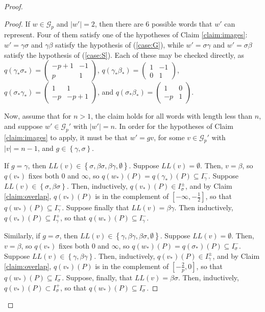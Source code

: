 \documentclass[10pt,a4paper]{amsart}
\newcommand{\set}[1]{ \left\{ #1 \right\} }
\begin{document}
\begin{proof}
\begin{proof}
If $w \in \mathcal{G}_p$ and $|w'| = 2$, then there are 6 possible words that $w'$ can represent. Four of them satisfy one of the hypotheses of Claim \ref{claim:images}: $w' = \gamma \sigma$ and $\gamma \beta$ satisfy the hypothesis of (\ref{case:G}), while  $w' = \sigma \gamma$ and $w' =  \sigma \beta $ satisfy the hypothesis of (\ref{case:S}). Each of these may be checked directly, as $q(\gamma_* \sigma_*) = \begin{pmatrix} -p+1 & -1 \\ p & 1 \end{pmatrix}$, $q(\gamma_* \beta_*)= \begin{pmatrix} 1 & -1 \\ 0 & 1 \end{pmatrix}$, $q(\sigma_* \gamma_*) = \begin{pmatrix} 1 & 1 \\ -p & -p+1 \end{pmatrix}$, and $q(\sigma_* \beta_*)= \begin{pmatrix} 1 & 0 \\ -p & 1 \end{pmatrix}$.

Now, assume that for $n > 1$, the claim holds for all words with length less than $n$, and suppose $w' \in \mathcal{G}_p'$ with $|w'| = n$. 
In order for the hypotheses of Claim \ref{claim:images} to apply, it must be that $w' = gv$, for some $v \in \mathcal{G}_p'$ with $|v| = n-1$, and $g \in \set{\gamma, \sigma}$. 

If $g = \gamma$, then $LL(v) \in \set{\sigma,  \beta \sigma,  \beta \gamma, \emptyset}$. Suppose $LL(v) = \emptyset$. Then, $v = \beta$, so $q(v_*)$ fixes both $0$ and $\infty$, so $q(w_*)(P) = q(\gamma_*)(P) \subseteq I_\gamma^-$. Suppose $LL(v) \in \set{\sigma, \beta \sigma}$. Then, inductively, $q(v_*)(P) \in I_\sigma^{\pm}$, and by Claim \ref{claim:overlap}, $q(v_*)(P)$ is in the complement of $[-\infty, -\frac{1}{2}]$, so that $q(w_*)(P) \subseteq I_\gamma^-$. Suppose finally that $LL(v) = \beta \gamma$. Then inductively, $q(v_*)(P) \subseteq I_\gamma^+$, so that $q(w_*)(P) \subseteq I_\gamma^-$. 

Similarly, if $g = \sigma$, then
$LL(v) \in \set{\gamma, \beta \gamma, \beta \sigma, \emptyset}$. Suppose $LL(v) = \emptyset$. Then, $v = \beta$, so $q(v_*)$ fixes both $0$ and $\infty$, so $q(w_*)(P) = q(\sigma_*)(P) \subseteq I_\sigma^-$. Suppose $LL(v) \in \set{\gamma, \beta \gamma}$. Then, inductively, $q(v_*)(P) \in I_\gamma^{\pm}$, and by Claim \ref{claim:overlap}, $q(v_*)(P)$ is in the complement of $[-\frac{2}{p}, 0]$, so that $q(w_*)(P) \subseteq I_\sigma^-$. Suppose, finally, that $LL(v) = \beta \sigma$. Then, inductively, $q(v_*)(P) \subset I_\sigma^+$, so that $q(w_*)(P) \subseteq I_\sigma^-$.
\end{proof}


\end{proof}
\end{document}
